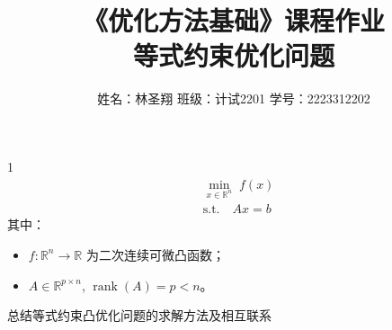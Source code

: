 \documentclass{article}
\newenvironment{problem_cn}[2][问题]{\begin{trivlist}
\item[\hskip \labelsep {\bfseries #1}\hskip \labelsep {\bfseries #2.}]}{\end{trivlist}}
\begin{document}

\title{《优化方法基础》课程作业\\等式约束优化问题}  %
\author{姓名：林圣翔 \quad 班级：计试2201 \quad 学号：2223312202}  %

\maketitle

\begin{problem_cn}{1}
\[
\begin{aligned}
& \min_{x \in \mathbb{R}^n} \; f(x) \\
& \text{s.t.} \quad Ax = b
\end{aligned}
\]
其中：
\begin{itemize}
    \item $f: \mathbb{R}^n \to \mathbb{R}$ 为二次连续可微凸函数；
    \item $A \in \mathbb{R}^{p \times n}$, $\operatorname{rank}(A) = p < n$。
\end{itemize}
总结等式约束凸优化问题的求解方法及相互联系 
\end{problem_cn}
\end{document}
